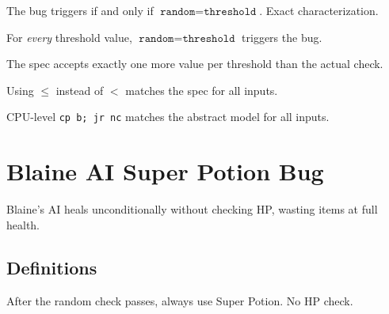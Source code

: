 \begin{theorem}\label{thm:bug_iff_equal}
  \leanok
  The bug triggers if and only if $\texttt{random} = \texttt{threshold}$. Exact characterization.
\end{theorem}

\begin{theorem}\label{thm:bug_at_every_threshold}
  \leanok
  For \emph{every} threshold value, $\texttt{random} = \texttt{threshold}$ triggers the bug.
\end{theorem}

\begin{theorem}\label{thm:exactly_one_extra_hit}
  \leanok
  The spec accepts exactly one more value per threshold than the actual check.
\end{theorem}

\begin{theorem}\label{thm:onein256_fix}
  \leanok
  Using $\le$ instead of $<$ matches the spec for all inputs.
\end{theorem}

\begin{theorem}\label{thm:sm83_accuracy}
  \leanok
  CPU-level \texttt{cp b; jr nc} matches the abstract model for all inputs.
\end{theorem}

\chapter{Blaine AI Super Potion Bug}\label{ch:blaine}

Blaine's AI heals unconditionally without checking HP, wasting items at full health.

\section{Definitions}

\begin{definition}\label{def:blaine_actual}
  \leanok
  After the random check passes, always use Super Potion. No HP check.
\end{definition}

